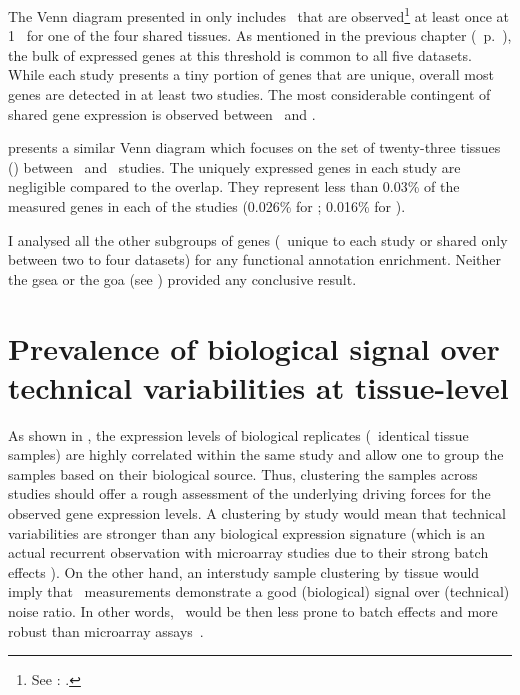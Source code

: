 The Venn diagram presented in  only includes \pcgs\
that are observed\footnote{See
: .}
at least once at 1 \FPKM\ for one of the four shared tissues.
As mentioned in the previous chapter (~p.~\pageref{def:trep}),
the bulk of expressed genes at this threshold is common
to all five datasets.
While each study presents a tiny portion of genes
that are unique,
overall most genes are detected in at least two studies.
The most considerable contingent of shared gene expression is observed
between \uhlen\ and \gtex.

 presents a similar Venn diagram
which focuses on the set of twenty-three tissues (\setTwo)
between \uhlen\ and \gtex\ studies.
The uniquely expressed genes in each study are negligible compared to the overlap.
They represent less than 0.03\% of the measured genes in each of the studies
(0.026\% for \uhlen; 0.016\% for \gtex).
\begin{comment}
    Gtex:   462/17551 hence 0.02632329\%
    Uhlen:  281/17551 hence 0.01601048\%
\end{comment}

I analysed all the other subgroups of genes
(\ie\ unique to each study or shared only between two to four datasets)
for any functional annotation enrichment.
Neither the \gls{gsea} or the \gls{goa}
(see )
provided any conclusive result.

\section{Prevalence of biological signal over technical variabilities at
tissue-level}\label{sec:Trans_ReproExpresTissue}

As shown in ,
the expression levels of biological replicates (\ie\ identical tissue samples)
are highly correlated within the same study
and allow one to group the samples based on their biological source.
Thus, clustering the samples across studies should offer a rough assessment of
the underlying driving forces for the observed gene expression levels.
A clustering by study would mean that technical variabilities are stronger
than any biological expression signature
(which is an actual recurrent observation with microarray studies
due to their strong batch effects \mycite{Sudmant2015-zt}).
On the other hand,
an interstudy sample clustering by tissue would imply that \Rnaseq\ measurements
demonstrate a good (biological) signal over (technical) noise ratio.
In other words,
\Rnaseq\ would be then less prone to batch effects and more robust than
microarray assays~\mycite{Taminau2014-hr,Walsh2015-nf}.

